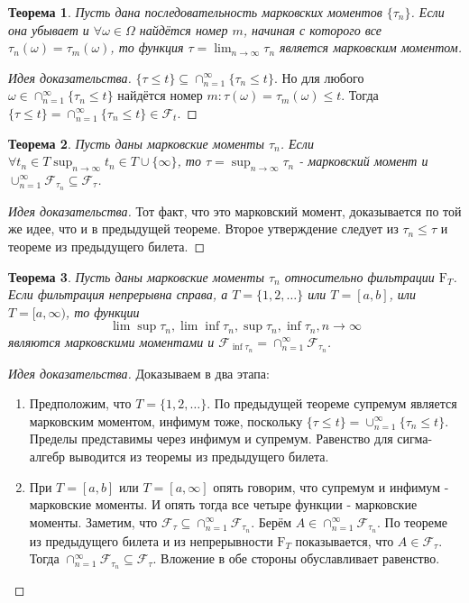 \documentclass[16pt]{article}
\newtheorem{theorem}{Теорема}[section]
\theoremstyle{definition}
\begin{document}
\begin{theorem}
Пусть дана последовательность марковских моментов $\{\tau_n\}$. Если она убывает и $\forall \omega \in \Omega$ найдётся номер $m$, начиная с которого все $\tau_n(\omega) = \tau_m(\omega)$, то функция $\tau = \lim_{n \rightarrow \infty}\tau_n$ является марковским моментом.
\end{theorem}
\begin{proof}[Идея доказательства]
$\{\tau \le t\} \subseteq \cap_{n = 1}^\infty \{\tau_n \le t\}$. Но для любого $\omega \in \cap_{n = 1}^\infty \{\tau_n \le t\}$ найдётся номер $m : \tau(\omega) = \tau_m(\omega) \le t$. Тогда $\{\tau \le t\} = \cap_{n = 1}^\infty \{\tau_n \le t\} \in \mathcal{F}_t$.
\end{proof}
\begin{theorem}
Пусть даны марковские моменты $\tau_n$. Если $\forall t_n \in T \sup_{n \rightarrow \infty}t_n \in T \cup \{\infty\}$, то $\tau = \sup_{n \rightarrow \infty}\tau_n$ - марковский момент и $\cup_{n = 1}^\infty \mathcal{F}_{\tau_n} \subseteq \mathcal{F}_\tau$.
\end{theorem}
\begin{proof}[Идея доказательства]
Тот факт, что это марковский момент, доказывается по той же идее, что и в предыдущей теореме. Второе утверждение следует из $\tau_n \le \tau$ и теореме из предыдущего билета.
\end{proof}
\begin{theorem}
Пусть даны марковские моменты $\tau_n$ относительно фильтрации $\mathrm{F}_T$. Если фильтрация непрерывна справа, а $T = \{1, 2, \ldots\}$ или $T = [a, b]$, или $T = [a, \infty)$, то функции $$\lim\sup \tau_n, \lim\inf \tau_n, \sup \tau_n, \inf \tau_n, n \rightarrow \infty$$ являются марковскими моментами и $\mathcal{F}_{\inf \tau_n} = \cap_{n = 1}^\infty \mathcal{F}_{\tau_n}$.
\end{theorem}
\begin{proof}[Идея доказательства]
Доказываем в два этапа:
\begin{enumerate}
    \item Предположим, что $T = \{1, 2, \ldots\}$. По предыдущей теореме супремум является марковским моментом, инфимум тоже, поскольку $\{\tau \le t\} = \cup_{n = 1}^\infty\{\tau_n \le t\}$. Пределы представимы через инфимум и супремум. Равенство для сигма-алгебр выводится из теоремы из предыдущего билета.
    \item При $T = [a, b]$ или $T = [a, \infty]$ опять говорим, что супремум и инфимум - марковские моменты. И опять тогда все четыре функции - марковские моменты. Заметим, что $\mathcal{F}_\tau \subseteq \cap_{n = 1}^\infty \mathcal{F}_{\tau_n}$. Берём $A \in \cap_{n = 1}^\infty \mathcal{F}_{\tau_n}$. По теореме из предыдущего билета и из непрерывности $\mathrm{F}_T$ показывается, что $A \in \mathcal{F}_\tau$. Тогда $\cap_{n = 1}^\infty \mathcal{F}_{\tau_n} \subseteq \mathcal{F}_\tau$. Вложение в обе стороны обуславливает равенство.
\end{enumerate}
\end{proof}
\end{document}
